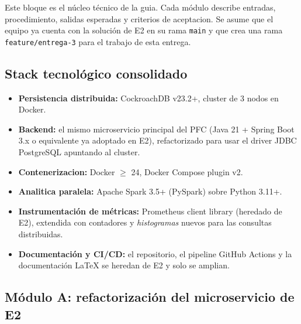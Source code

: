 \documentclass[11pt,a4paper]{article}
\begin{document}
    Este bloque es el núcleo técnico de la guia. Cada módulo describe entradas, procedimiento, salidas esperadas y criterios de aceptacion. Se asume que el equipo ya cuenta con la solución de E2 en su rama \texttt{main} y que crea una rama \texttt{feature/entrega-3} para el trabajo de esta entrega.

\subsection{Stack tecnológico consolidado}

    \begin{utqbox}[title={Stack obligatorio para E3}]
        \small
        \begin{itemize}
            \item \textbf{Persistencia distribuida:} CockroachDB v23.2+, cluster de 3 nodos en Docker.
            \item \textbf{Backend:} el mismo microservicio principal del PFC (Java 21 + Spring Boot 3.x o equivalente ya adoptado en E2), refactorizado para usar el driver JDBC PostgreSQL apuntando al cluster.
            \item \textbf{Contenerizacion:} Docker $\ge$ 24, Docker Compose plugin v2.
            \item \textbf{Analitica paralela:} Apache Spark 3.5+ (PySpark) sobre Python 3.11+.
            \item \textbf{Instrumentación de métricas:} Prometheus client library (heredado de E2), extendida con contadores y \textit{histogramas} nuevos para las consultas distribuidas.
            \item \textbf{Documentación y CI/CD:} el repositorio, el pipeline GitHub Actions y la documentación LaTeX se heredan de E2 y solo se amplian.
        \end{itemize}
    \end{utqbox}

\subsection{Módulo A: refactorización del microservicio de E2}
\end{document}
